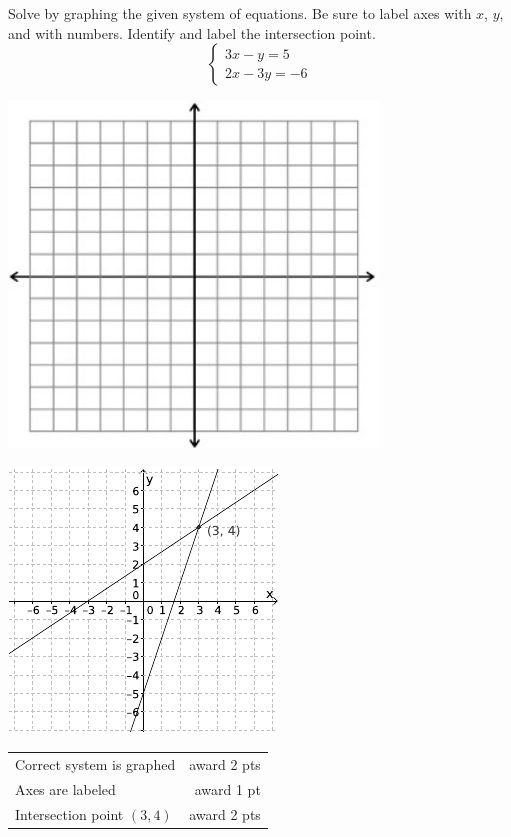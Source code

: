 {
	Solve by graphing the given system of equations. Be sure to label axes with $x$, $y$, and with numbers. Identify and label the intersection point. $$\begin{cases}3x-y=5\\ 2x-3y=-6\end{cases}$$ \begin{onlyproblem}\begin{center}\includegraphics{fig-graphpaper.png}\end{center}\end{onlyproblem} \begin{onlysolution}\begin{center}\includegraphics{fig095-10-d-answer}\end{center}\end{onlysolution}
	
}
{
	\begin{tabular}{l r}
	Correct system is graphed & award 2 pts\\
	Axes are labeled & award 1 pt\\
	Intersection point $(3,4)$ & award 2 pts
	\end{tabular}
}
